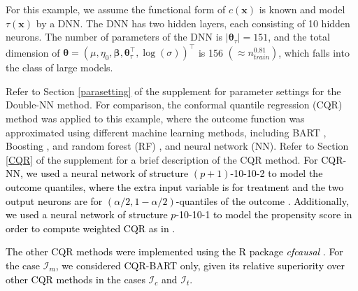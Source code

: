 \documentclass[11pt]{article}
\newcommand{\bx}{{\boldsymbol x}}
\newcommand{\bbeta}{{\boldsymbol \beta}}
\newcommand{\btheta}{{\boldsymbol \theta}}
\begin{document}
For this example, we assume the functional form of $c(\bx)$ is known and model  
$\tau(\bx)$ by a DNN. The DNN has two hidden layers,  each consisting of 10 hidden neurons. The number of parameters of the DNN is $|\btheta_{\tau}|=151$, and the total dimension of $\btheta=(\mu, \eta_0,\bbeta,\btheta_{\tau}^{\top},\log(\sigma))^{\top}$ is 156 $(\approx n_{train}^{0.81})$, which falls into the class of large models. 



Refer to Section \ref{parasetting} of the supplement for parameter settings 
for the Double-NN method.  
For comparison, the conformal quantile 
regression (CQR) method \citep{Romano2019ConformalizedQR,lei2021ite} was applied to this example, where the outcome function was approximated using different machine learning methods, including 
BART \citep{Chipman2010BARTBA}, Boosting \citep{Schapire1990TheSO,Breiman1998ArcingC}, and random forest (RF) \citep{breiman2001random}, and neural network (NN).
Refer to Section \ref{CQR} of the supplement for a brief description of the CQR method. 
\textcolor{black}{For CQR-NN, we used a neural network of structure $(p+1)$-10-10-2 to model the outcome quantiles, where the extra input variable is for treatment and the two output neurons are for $(\alpha/2,1-\alpha/2)$-quantiles of the outcome
\citep{Romano2019ConformalizedQR}. Additionally,
we used a neural network of structure  $p$-10-10-1 to model the propensity score in order to compute weighted CQR as in \cite{lei2021ite}.}



\textcolor{black}{The other CQR methods were implemented using the R package {\it cfcausal} \citep{lei2021ite}.}
\textcolor{black}{For the case  $\mathcal{I}_m$, we considered CQR-BART only, given its relative  
superiority over other CQR methods in 
the cases $\mathcal{I}_c$ and $\mathcal{I}_t$.}
\end{document}
